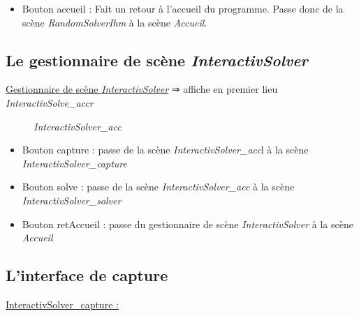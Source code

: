 \begin{itemize}
	\item Bouton accueil : Fait un retour à l'accueil du programme. Passe donc de la scène \textit{RandomSolverIhm} à la scène \textit{Accueil}.
\end{itemize}

\subsection{Le gestionnaire de scène \textit{InteractivSolver}}
\underline{Gestionnaire de scène \textit{InteractivSolver}}
⇒ affiche en premier lieu \textit{InteractivSolve\_accr}

\begin{figure}[h]
\begin{center}
\end{center}
	\caption{ \textit{InteractivSolver\_acc}}
\end{figure}

\begin{itemize}
    \item Bouton capture : passe de la scène \textit{InteractivSolver\_acc}l à la scène \textit{InteractivSolver\_capture}
    \item Bouton solve : passe de la scène \textit{InteractivSolver\_acc} à la scène \textit{InteractivSolver\_solver}
    \item Bouton retAccueil : passe du gestionnaire de scène \textit{InteractivSolver} à la scène \textit{Accueil}
\end{itemize}

\subsection{L'interface de capture}
\underline{InteractivSolver\_capture :}

